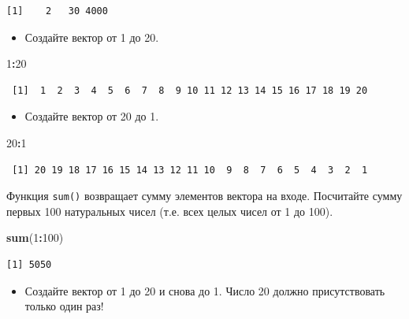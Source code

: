 \documentclass[
]{book}
\newenvironment{Shaded}{\begin{snugshade}}{\end{snugshade}}
\newcommand{\DecValTok}[1]{\textcolor[rgb]{0.00,0.00,0.81}{#1}}
\newcommand{\KeywordTok}[1]{\textcolor[rgb]{0.13,0.29,0.53}{\textbf{#1}}}
\newcommand{\NormalTok}[1]{#1}
\newcommand{\OperatorTok}[1]{\textcolor[rgb]{0.81,0.36,0.00}{\textbf{#1}}}
\providecommand{\tightlist}{%
  \setlength{\itemsep}{0pt}\setlength{\parskip}{0pt}}
\begin{document}
\begin{verbatim}
[1]    2   30 4000
\end{verbatim}

\begin{itemize}
\tightlist
\item
  Создайте вектор от 1 до 20.
\end{itemize}

\begin{Shaded}
\begin{Highlighting}[]
\DecValTok{1}\OperatorTok{:}\DecValTok{20}
\end{Highlighting}
\end{Shaded}

\begin{verbatim}
 [1]  1  2  3  4  5  6  7  8  9 10 11 12 13 14 15 16 17 18 19 20
\end{verbatim}

\begin{itemize}
\tightlist
\item
  Создайте вектор от 20 до 1.
\end{itemize}

\begin{Shaded}
\begin{Highlighting}[]
\DecValTok{20}\OperatorTok{:}\DecValTok{1}
\end{Highlighting}
\end{Shaded}

\begin{verbatim}
 [1] 20 19 18 17 16 15 14 13 12 11 10  9  8  7  6  5  4  3  2  1
\end{verbatim}

Функция \texttt{sum()} возвращает сумму элементов вектора на входе. Посчитайте сумму первых 100 натуральных чисел (т.е. всех целых чисел от 1 до 100).

\begin{Shaded}
\begin{Highlighting}[]
\KeywordTok{sum}\NormalTok{(}\DecValTok{1}\OperatorTok{:}\DecValTok{100}\NormalTok{)}
\end{Highlighting}
\end{Shaded}

\begin{verbatim}
[1] 5050
\end{verbatim}

\begin{itemize}
\tightlist
\item
  Создайте вектор от 1 до 20 и снова до 1. Число 20 должно присутствовать только один раз!
\end{itemize}
\end{document}
